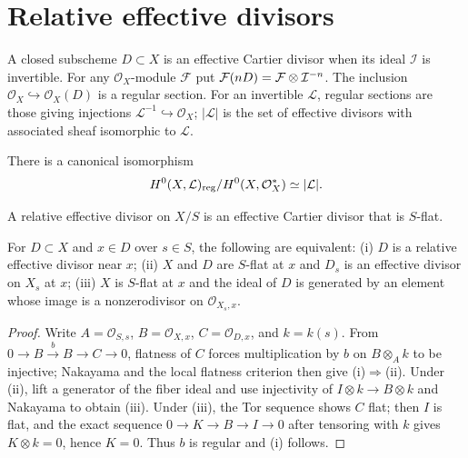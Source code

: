 \section{Relative effective divisors}\label{kps-sec-divisors}

\begin{definition}\label{kps-def-effective-divisor}
A closed subscheme $D\subset X$ is an effective Cartier divisor when its ideal
$\mathcal I$ is invertible. For any $\mathcal O_X$-module $\mathcal F$ put
$\mathcal F(nD)=\mathcal F\otimes\mathcal I^{-n}$. The inclusion
$\mathcal O_X\hookrightarrow\mathcal O_X(D)$ is a regular section. For an
invertible $\mathcal L$, regular sections are those giving injections
$\mathcal L^{-1}\hookrightarrow\mathcal O_X$; $|\mathcal L|$ is the set of
effective divisors with associated sheaf isomorphic to $\mathcal L$.
\end{definition}

\begin{remark}\label{kps-ex-linear-system}
There is a canonical isomorphism
\[H^0(X,\mathcal L)_{\rm reg}/H^0(X,\mathcal O_X^*)\simeq|\mathcal L|.\]
\end{remark}

\begin{definition}\label{kps-def-relative-divisor}
A relative effective divisor on $X/S$ is an effective Cartier divisor that is
$S$-flat.
\end{definition}

\begin{lemma}\label{kps-lem-relative-criterion}
For $D\subset X$ and $x\in D$ over $s\in S$, the following are equivalent:
(i) $D$ is a relative effective divisor near $x$; (ii) $X$ and $D$ are
$S$-flat at $x$ and $D_s$ is an effective divisor on $X_s$ at $x$; (iii) $X$
is $S$-flat at $x$ and the ideal of $D$ is generated by an element whose image
is a nonzerodivisor on $\mathcal O_{X_s,x}$.
\end{lemma}
\begin{proof}
Write $A=\mathcal O_{S,s}$, $B=\mathcal O_{X,x}$, $C=\mathcal O_{D,x}$,
and $k=k(s)$. From $0\to B\xrightarrow bB\to C\to0$, flatness of $C$
forces multiplication by $b$ on $B\otimes_Ak$ to be injective; Nakayama and
the local flatness criterion then give (i)$\Rightarrow$(ii). Under (ii), lift a
generator of the fiber ideal and use injectivity of $I\otimes k\to B\otimes k$
and Nakayama to obtain (iii). Under (iii), the Tor sequence shows $C$ flat;
then $I$ is flat, and the exact sequence $0\to K\to B\to I\to0$ after tensoring
with $k$ gives $K\otimes k=0$, hence $K=0$. Thus $b$ is regular and (i) follows.
\end{proof}

